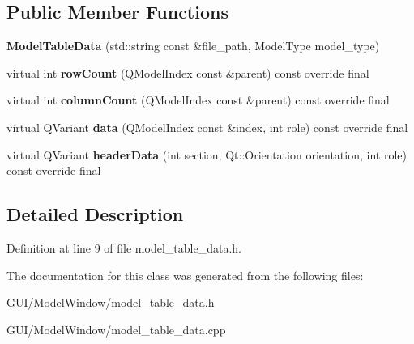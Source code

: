 \subsection*{Public Member Functions}
\begin{DoxyCompactItemize}
\item 
\mbox{\label{classModelTableData_a55b75d87fd591b326fb3deb130f2a981}} 
{\bfseries Model\+Table\+Data} (std\+::string const \&file\+\_\+path, Model\+Type model\+\_\+type)
\item 
\mbox{\label{classModelTableData_ad74b4571c5eb8bf2f84d16392f0885a8}} 
virtual int {\bfseries row\+Count} (Q\+Model\+Index const \&parent) const override final
\item 
\mbox{\label{classModelTableData_a269f93a13692b67fe9513433b02ec1ef}} 
virtual int {\bfseries column\+Count} (Q\+Model\+Index const \&parent) const override final
\item 
\mbox{\label{classModelTableData_a8e9e7be0b67bdefc68b5fe6b05c38acf}} 
virtual Q\+Variant {\bfseries data} (Q\+Model\+Index const \&index, int role) const override final
\item 
\mbox{\label{classModelTableData_a86985a36d748a7cf35302d8a0c63752a}} 
virtual Q\+Variant {\bfseries header\+Data} (int section, Qt\+::\+Orientation orientation, int role) const override final
\end{DoxyCompactItemize}


\subsection{Detailed Description}


Definition at line 9 of file model\+\_\+table\+\_\+data.\+h.



The documentation for this class was generated from the following files\+:\begin{DoxyCompactItemize}
\item 
G\+U\+I/\+Model\+Window/model\+\_\+table\+\_\+data.\+h\item 
G\+U\+I/\+Model\+Window/model\+\_\+table\+\_\+data.\+cpp\end{DoxyCompactItemize}
